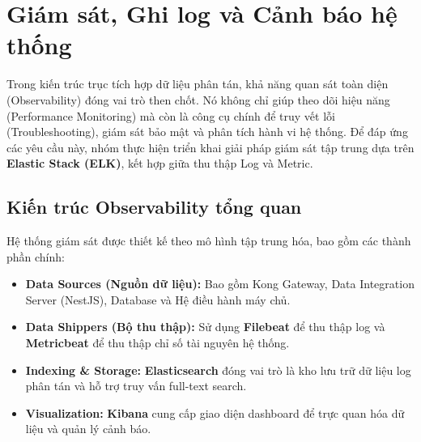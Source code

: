 \chapter{Giám sát, Ghi log và Cảnh báo hệ thống}

Trong kiến trúc trục tích hợp dữ liệu phân tán, khả năng quan sát toàn diện (Observability) đóng vai trò then chốt. Nó không chỉ giúp theo dõi hiệu năng (Performance Monitoring) mà còn là công cụ chính để truy vết lỗi (Troubleshooting), giám sát bảo mật và phân tích hành vi hệ thống. Để đáp ứng các yêu cầu này, nhóm thực hiện triển khai giải pháp giám sát tập trung dựa trên \textbf{Elastic Stack (ELK)}, kết hợp giữa thu thập Log và Metric.

\section{Kiến trúc Observability tổng quan}

Hệ thống giám sát được thiết kế theo mô hình tập trung hóa, bao gồm các thành phần chính:

\begin{itemize}
    \item \textbf{Data Sources (Nguồn dữ liệu):} Bao gồm Kong Gateway, Data Integration Server (NestJS), Database và Hệ điều hành máy chủ.
    \item \textbf{Data Shippers (Bộ thu thập):} Sử dụng \textbf{Filebeat} để thu thập log và \textbf{Metricbeat} để thu thập chỉ số tài nguyên hệ thống.
    \item \textbf{Indexing \& Storage:} \textbf{Elasticsearch} đóng vai trò là kho lưu trữ dữ liệu log phân tán và hỗ trợ truy vấn full-text search.
    \item \textbf{Visualization:} \textbf{Kibana} cung cấp giao diện dashboard để trực quan hóa dữ liệu và quản lý cảnh báo.
\end{itemize}

